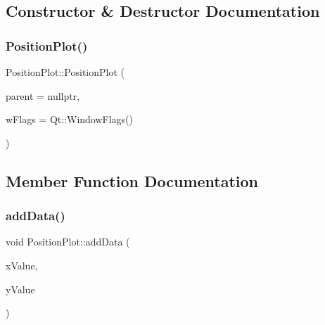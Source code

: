 \subsection{Constructor \& Destructor Documentation}
\mbox{\label{class_position_plot_ac02288786b05c969ddde336ff57ed2c4}} 
\subsubsection{\texorpdfstring{Position\+Plot()}{PositionPlot()}}
{\footnotesize\ttfamily Position\+Plot\+::\+Position\+Plot (\begin{DoxyParamCaption}\item[{Q\+Graphics\+Item $\ast$}]{parent = {\ttfamily nullptr},  }\item[{Qt\+::\+Window\+Flags}]{w\+Flags = {\ttfamily Qt\+:\+:WindowFlags()} }\end{DoxyParamCaption})\hspace{0.3cm}{\ttfamily [explicit]}}



\subsection{Member Function Documentation}
\mbox{\label{class_position_plot_ad99acc56eb9f6ec4add56316362d2ccb}} 
\subsubsection{\texorpdfstring{add\+Data()}{addData()}}
{\footnotesize\ttfamily void Position\+Plot\+::add\+Data (\begin{DoxyParamCaption}\item[{qreal}]{x\+Value,  }\item[{qreal}]{y\+Value }\end{DoxyParamCaption})}

\mbox{\label{class_position_plot_a403766146dab39927aa578765f644625}} 
